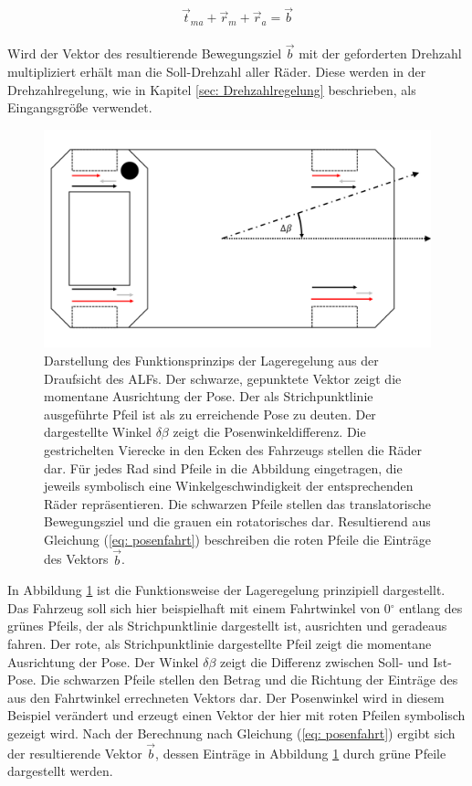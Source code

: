 		\begin{equation}
		\vec{t}_{ma} + \vec{r}_m + \vec{r}_a = \vec{b} 
		\label{eq: posenfahrt}
		\end{equation}  \\		
		Wird der Vektor des resultierende Bewegungsziel $\vec{b}$ mit der geforderten Drehzahl multipliziert erhält man die Soll-Drehzahl aller Räder. Diese werden in der Drehzahlregelung, wie in Kapitel \ref{sec: Drehzahlregelung} beschrieben, als Eingangsgröße verwendet.  
		
		\begin{figure}[H]
			\centering
			\includegraphics[width=1.0\textwidth]{Bilder/winkelregelung.png}
			\caption{Darstellung des Funktionsprinzips der Lageregelung aus der Draufsicht des ALFs. Der schwarze, gepunktete Vektor zeigt die momentane Ausrichtung der Pose. Der als Strichpunktlinie ausgeführte Pfeil ist als zu erreichende Pose zu deuten. Der dargestellte Winkel $\delta \beta$ zeigt die Posenwinkeldifferenz. Die gestrichelten Vierecke in den Ecken des Fahrzeugs stellen die Räder dar. Für jedes Rad sind Pfeile in die Abbildung eingetragen, die jeweils symbolisch eine Winkelgeschwindigkeit der entsprechenden Räder repräsentieren. Die schwarzen Pfeile stellen das translatorische Bewegungsziel und die grauen ein rotatorisches dar. Resultierend aus Gleichung (\ref{eq: posenfahrt}) beschreiben die roten Pfeile die Einträge des Vektors $\vec{b}$.}
			\label{fig: Winkelregelung}
		\end{figure}
		
		In Abbildung \ref{fig: Winkelregelung} ist die Funktionsweise der Lageregelung prinzipiell dargestellt. Das Fahrzeug soll sich hier beispielhaft mit einem Fahrtwinkel von 0$^\circ$ entlang des grünes Pfeils, der als Strichpunktlinie dargestellt ist, ausrichten und geradeaus fahren. Der rote, als Strichpunktlinie dargestellte Pfeil zeigt die momentane Ausrichtung der Pose. Der Winkel $\delta \beta$ zeigt die Differenz zwischen Soll- und Ist-Pose. Die schwarzen Pfeile stellen den Betrag und die Richtung der Einträge des aus den Fahrtwinkel errechneten Vektors dar. Der Posenwinkel wird in diesem Beispiel verändert und erzeugt einen Vektor der hier mit roten Pfeilen symbolisch gezeigt wird. Nach der Berechnung nach Gleichung (\ref{eq: posenfahrt}) ergibt sich der resultierende Vektor $\vec{b}$, dessen Einträge in Abbildung \ref{fig: Winkelregelung} durch grüne Pfeile dargestellt werden. 
		
